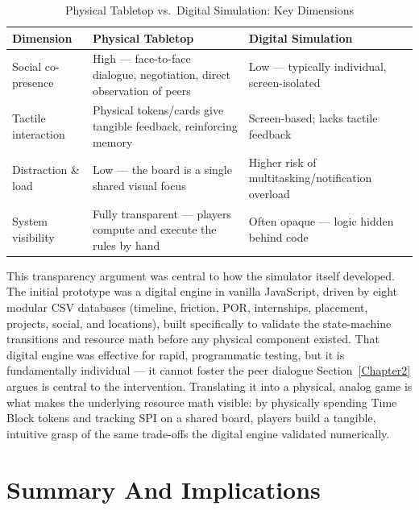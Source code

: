 \begin{table}[htbp]
\centering
\caption{Physical Tabletop vs.\ Digital Simulation: Key Dimensions}
\label{tab:tabletop_vs_digital}
\begin{tabular}{@{}p{2.5cm}p{5.5cm}p{5cm}@{}}
\toprule
\textbf{Dimension} & \textbf{Physical Tabletop} & \textbf{Digital Simulation} \\
\midrule
Social co-presence & High --- face-to-face dialogue, negotiation, direct observation of peers~\cite{Bartolucci-2019, Booth-2019} & Low --- typically individual, screen-isolated~\cite{Booth-2019} \\
\addlinespace
Tactile interaction & Physical tokens/cards give tangible feedback, reinforcing memory~\cite{Sousa-2021, Pixelixe-2024} & Screen-based; lacks tactile feedback~\cite{Pixelixe-2024} \\
\addlinespace
Distraction \& load & Low --- the board is a single shared visual focus~\cite{Carr-2013} & Higher risk of multitasking/notification overload~\cite{Carr-2013} \\
\addlinespace
System visibility & Fully transparent --- players compute and execute the rules by hand~\cite{Bayeck-2020, Bartolucci-2019} & Often opaque --- logic hidden behind code~\cite{Yatani-2024} \\
\bottomrule
\end{tabular}
\end{table}

This transparency argument was central to how the simulator itself developed. The initial prototype was a digital engine in vanilla JavaScript, driven by eight modular CSV databases (timeline, friction, POR, internships, placement, projects, social, and locations), built specifically to validate the state-machine transitions and resource math before any physical component existed. That digital engine was effective for rapid, programmatic testing, but it is fundamentally individual --- it cannot foster the peer dialogue Section~\ref{Chapter2} argues is central to the intervention. Translating it into a physical, analog game is what makes the underlying resource math visible: by physically spending Time Block tokens and tracking SPI on a shared board, players build a tangible, intuitive grasp of the same trade-offs the digital engine validated numerically.

\section{Summary And Implications}

